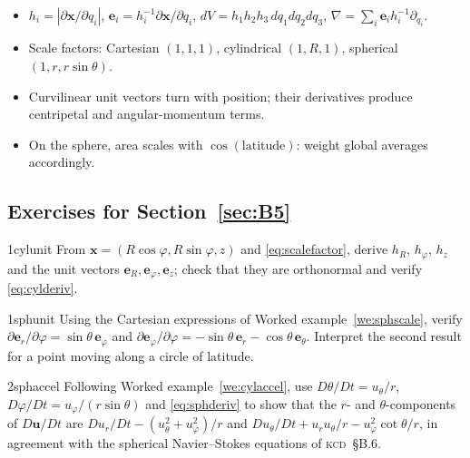 \documentclass[11pt,letterpaper]{article}
\numberwithin{equation}{section}
\newcommand{\uu}{\mathbf{u}}
\newcommand{\xx}{\mathbf{x}}
\newcommand{\e}[1]{\mathbf{e}_{#1}}
\newcommand{\Kundu}{\textnormal{\textsc{kcd}}}   %
\begin{document}
\begin{remember}
\begin{itemize}
  \item $h_i=|\partial\xx/\partial q_i|$, $\e{i}=h_i^{-1}\partial\xx/\partial q_i$, $dV=h_1h_2h_3\,dq_1dq_2dq_3$, $\nabla=\sum_i\e{i}h_i^{-1}\partial_{q_i}$.
  \item Scale factors: Cartesian $(1,1,1)$, cylindrical $(1,R,1)$, spherical $(1,r,r\sin\theta)$.
  \item Curvilinear unit vectors turn with position; their derivatives produce centripetal and angular-momentum terms.
  \item On the sphere, area scales with $\cos(\text{latitude})$: weight global averages accordingly.
\end{itemize}
\end{remember}

\subsection*{Exercises for Section~\ref{sec:B5}}

\begin{exercise}{1}{cylunit}
From $\xx=(R\cos\varphi,R\sin\varphi,z)$ and \eqref{eq:scalefactor}, derive $h_R$, $h_\varphi$, $h_z$ and the unit vectors
$\e{R},\e{\varphi},\e{z}$; check that they are orthonormal and verify \eqref{eq:cylderiv}.
\end{exercise}

\begin{exercise}{1}{sphunit}
Using the Cartesian expressions of Worked example~\ref{we:sphscale}, verify $\partial\e{r}/\partial\varphi=\sin\theta\,\e{\varphi}$ and
$\partial\e{\varphi}/\partial\varphi=-\sin\theta\,\e{r}-\cos\theta\,\e{\theta}$. Interpret the second result for a point moving along a circle of
latitude.
\end{exercise}

\begin{exercise}{2}{sphaccel}
Following Worked example~\ref{we:cylaccel}, use $D\theta/Dt=u_\theta/r$, $D\varphi/Dt=u_\varphi/(r\sin\theta)$ and \eqref{eq:sphderiv} to show that
the $r$- and $\theta$-components of $D\uu/Dt$ are $Du_r/Dt-(u_\theta^2+u_\varphi^2)/r$ and $Du_\theta/Dt+u_ru_\theta/r-u_\varphi^2\cot\theta/r$,
in agreement with the spherical Navier--Stokes equations of \Kundu\ \S B.6.
\end{exercise}
\end{document}
